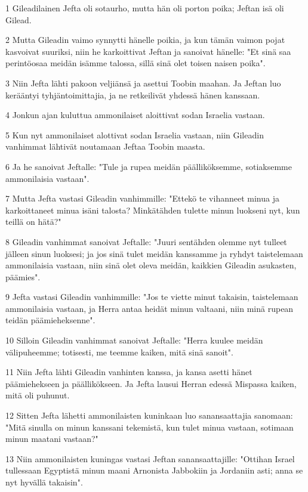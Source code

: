 \par 1 Gileadilainen Jefta oli sotaurho, mutta hän oli porton poika; Jeftan isä oli Gilead.
\par 2 Mutta Gileadin vaimo synnytti hänelle poikia, ja kun tämän vaimon pojat kasvoivat suuriksi, niin he karkoittivat Jeftan ja sanoivat hänelle: "Et sinä saa perintöosaa meidän isämme talossa, sillä sinä olet toisen naisen poika".
\par 3 Niin Jefta lähti pakoon veljiänsä ja asettui Toobin maahan. Ja Jeftan luo kerääntyi tyhjäntoimittajia, ja ne retkeilivät yhdessä hänen kanssaan.
\par 4 Jonkun ajan kuluttua ammonilaiset aloittivat sodan Israelia vastaan.
\par 5 Kun nyt ammonilaiset alottivat sodan Israelia vastaan, niin Gileadin vanhimmat lähtivät noutamaan Jeftaa Toobin maasta.
\par 6 Ja he sanoivat Jeftalle: "Tule ja rupea meidän päälliköksemme, sotiaksemme ammonilaisia vastaan".
\par 7 Mutta Jefta vastasi Gileadin vanhimmille: "Ettekö te vihanneet minua ja karkoittaneet minua isäni talosta? Minkätähden tulette minun luokseni nyt, kun teillä on hätä?"
\par 8 Gileadin vanhimmat sanoivat Jeftalle: "Juuri sentähden olemme nyt tulleet jälleen sinun luoksesi; ja jos sinä tulet meidän kanssamme ja ryhdyt taistelemaan ammonilaisia vastaan, niin sinä olet oleva meidän, kaikkien Gileadin asukasten, päämies".
\par 9 Jefta vastasi Gileadin vanhimmille: "Jos te viette minut takaisin, taistelemaan ammonilaisia vastaan, ja Herra antaa heidät minun valtaani, niin minä rupean teidän päämieheksenne".
\par 10 Silloin Gileadin vanhimmat sanoivat Jeftalle: "Herra kuulee meidän välipuheemme; totisesti, me teemme kaiken, mitä sinä sanoit".
\par 11 Niin Jefta lähti Gileadin vanhinten kanssa, ja kansa asetti hänet päämiehekseen ja päällikökseen. Ja Jefta lausui Herran edessä Mispassa kaiken, mitä oli puhunut.
\par 12 Sitten Jefta lähetti ammonilaisten kuninkaan luo sanansaattajia sanomaan: "Mitä sinulla on minun kanssani tekemistä, kun tulet minua vastaan, sotimaan minun maatani vastaan?"
\par 13 Niin ammonilaisten kuningas vastasi Jeftan sanansaattajille: "Ottihan Israel tullessaan Egyptistä minun maani Arnonista Jabbokiin ja Jordaniin asti; anna se nyt hyvällä takaisin".
